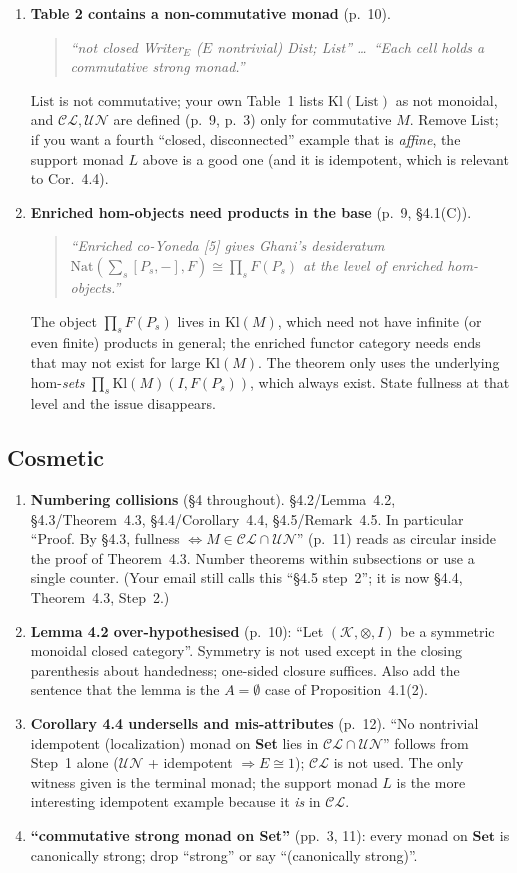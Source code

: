 \documentclass[11pt]{article}
\newcommand{\Kl}{\mathrm{Kl}}
\newcommand{\Set}{\mathbf{Set}}
\newcommand{\CL}{\mathcal{CL}}
\newcommand{\UN}{\mathcal{UN}}
\newenvironment{quoted}{\begin{quote}\small\itshape}{\end{quote}}
\begin{document}
\begin{enumerate}[leftmargin=*]
\item \textbf{Table 2 contains a non-commutative monad} (p.~10).
\begin{quoted}
``not closed \quad Writer$_E$ ($E$ nontrivial) \quad Dist; List'' \ldots\ ``Each cell
holds a commutative strong monad.''
\end{quoted}
$\mathrm{List}$ is not commutative; your own Table~1 lists $\Kl(\mathrm{List})$ as
not monoidal, and $\CL,\UN$ are defined (p.~9, p.~3) only for commutative $M$.
Remove $\mathrm{List}$; if you want a fourth ``closed, disconnected'' example that
is \emph{affine}, the support monad $L$ above is a good one (and it is idempotent,
which is relevant to Cor.~4.4).

\item \textbf{Enriched hom-objects need products in the base} (p.~9, \S4.1(C)).
\begin{quoted}
``Enriched co-Yoneda [5] gives Ghani's desideratum
$\mathrm{Nat}(\sum_s[P_s,-],F)\cong\prod_sF(P_s)$ at the level of enriched hom-objects.''
\end{quoted}
The object $\prod_sF(P_s)$ lives in $\Kl(M)$, which need not have infinite (or
even finite) products in general; the enriched functor category needs ends that
may not exist for large $\Kl(M)$. The theorem only uses the underlying hom-\emph{sets}
$\prod_s\Kl(M)(I,F(P_s))$, which always exist. State fullness at that level and
the issue disappears.
\end{enumerate}

\subsection*{Cosmetic}
\begin{enumerate}[leftmargin=*,resume]
\item \textbf{Numbering collisions} (\S4 throughout). \S4.2/Lemma~4.2,
\S4.3/Theorem~4.3, \S4.4/Corollary~4.4, \S4.5/Remark~4.5. In particular ``Proof. By
\S4.3, fullness $\iff M\in\CL\cap\UN$'' (p.~11) reads as circular inside the proof of
Theorem~4.3. Number theorems within subsections or use a single counter. (Your
email still calls this ``\S4.5 step~2''; it is now \S4.4, Theorem~4.3, Step~2.)
\item \textbf{Lemma 4.2 over-hypothesised} (p.~10): ``Let $(\mathcal K,\otimes,I)$ be a
symmetric monoidal closed category''. Symmetry is not used except in the closing
parenthesis about handedness; one-sided closure suffices. Also add the sentence
that the lemma is the $A=\emptyset$ case of Proposition~4.1(2).
\item \textbf{Corollary 4.4 undersells and mis-attributes} (p.~12). ``No nontrivial
idempotent (localization) monad on \textbf{Set} lies in $\CL\cap\UN$'' follows from
Step~1 alone ($\UN$ + idempotent $\Rightarrow E\cong1$); $\CL$ is not used. The only
witness given is the terminal monad; the support monad $L$ is the more interesting
idempotent example because it \emph{is} in $\CL$.
\item \textbf{``commutative strong monad on Set''} (pp.~3, 11): every monad on $\Set$
is canonically strong; drop ``strong'' or say ``(canonically strong)''.
\end{enumerate}
\end{document}
